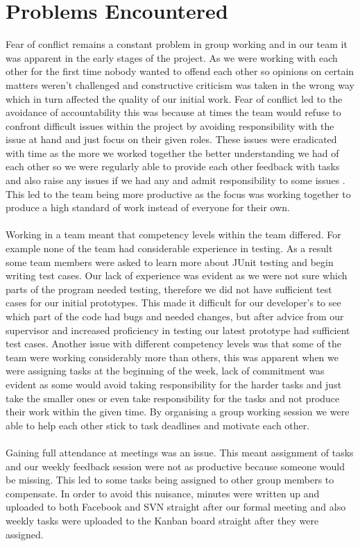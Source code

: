 \documentclass[10pt,a4paper]{article}
\begin{document}
\section{Problems Encountered}
Fear of conflict remains a constant problem in group working and in our team it was apparent in the early stages of the project. As we were working with each other for the first time nobody wanted to offend each other so opinions on certain matters weren’t challenged and constructive criticism was taken in the wrong way which in turn affected the quality of our initial work. Fear of conflict led to the avoidance of accountability this was because at times the team would refuse to confront difficult issues within the project by avoiding responsibility with the issue at hand and just focus on their given roles. These issues were eradicated with time as the more we worked together the better understanding we had of each other so we were regularly able to provide each other feedback with tasks and also raise any issues if we had any and admit responsibility to some issues . This led to the team being more productive as the focus was working together to produce a high standard of work instead of everyone for their own. \\
\\
Working in a team meant that competency levels within the team differed. For example none of the team had considerable experience in testing. As a result some team members were asked to learn more about JUnit testing and begin writing test cases. Our lack of experience was evident as we were not sure which parts of the program needed testing, therefore we did not have sufficient test cases for our initial prototypes. This made it difficult for our developer’s to see which part of the code had bugs and needed changes, but after advice from our supervisor and increased proficiency in testing our latest prototype had sufficient test cases. Another issue with different competency levels was that some of the team were working considerably more than others, this was apparent when we were assigning tasks at the beginning of the week, lack of commitment was evident as some would avoid taking responsibility for the harder tasks and just take the smaller ones or even take responsibility for the tasks and not produce their work within the given time. By organising a group working session we were able to help each other stick to task deadlines and motivate each other.\\ 
\\
Gaining full attendance at meetings was an issue. This meant assignment of tasks and our weekly feedback session were not as productive because someone would be missing. This led to some tasks being assigned to other group members to compensate. In order to avoid this nuisance, minutes were written up and uploaded to both Facebook and SVN straight after our formal meeting and also weekly tasks were uploaded to the Kanban board straight after they were assigned. \\
\end{document}
